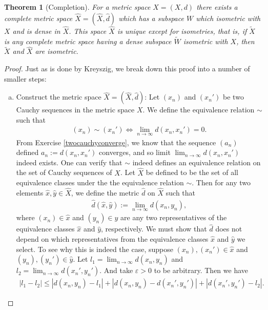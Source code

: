 \documentclass[11pt]{article}
\theoremstyle{mystyle}
\newtheorem{thm}{Theorem}[section]
\begin{document}
\begin{thm}[Completion]\label{completion}
For a metric space $X = (X, d)$ there exists a complete metric space $\hat{X} = (\hat{X}, \hat{d})$ which has a subspace $W$ which isometric with $X$ and is dense in $\hat{X}$. This space $\hat{X}$ is unique except for isometries, that is, if $\tilde{X}$ is any complete metric space having a dense subspace $\tilde{W}$ isometric with $X$, then $\tilde{X}$ and $\hat{X}$ are isometric.
\end{thm}
\begin{proof}
Just as is done by Kreyszig, we break down this proof into a number of smaller steps:
\begin{enumerate}[(a)] 
\item Construct the metric space $\hat{X} = (\hat{X}, \hat{d})$:\newline
Let $(x_n)$ and $(x_n')$ be two Cauchy sequences in the metric space $X$. We define the equivalence relation $\sim$ such that 
\begin{align*}
 (x_n) \sim (x_n') \iff \lim_{n \longrightarrow \infty} d(x_n, x_n') = 0.   
\end{align*}
From Exercise \ref{twocauchyconverge}, we know that the sequence $(a_n)$ defined $a_n := d(x_n, x_n')$ converges, and so limit $\lim_{n \longrightarrow \infty} d(x_n, x_n')$ indeed exists. One can verify that $\sim$ indeed defines an equivalence relation on the set of Cauchy sequences of $X$.\newline
Let $\hat{X}$ be defined to be the set of all equivalence classes under the the equivalence relation $\sim$. Then for any two elements $\hat{x}, \hat{y} \in \hat{X}$, we define the metric $\hat{d}$ on $\hat{X}$ such that
\begin{align*}
    \hat{d}(\hat{x}, \hat{y}) := \lim_{n \to \infty} d(x_n, y_n),
\end{align*}
where $(x_n) \in \hat{x}$ and $(y_n) \in \hat{y}$ are any two representatives of the equivalence classes $\hat{x}$ and $\hat{y}$, respectively. We must show that $\hat{d}$ does not depend on which representatives from the equivalence classes $\hat{x}$ and $\hat{y}$ we select.\newline 
To see why this is indeed the case, suppose $(x_n), (x_n') \in \hat{x}$ and $(y_n), (y_n') \in \hat{y}$. Let $l_1 = \lim_{n \to \infty} d(x_n, y_n)$ and $l_2 = \lim_{n \to \infty} d(x_n', y_n')$. And take $\varepsilon > 0$ to be arbitrary. Then we have
\begin{align*}
    |l_1 - l_2| \leq |d(x_n, y_n) - l_1|  + |d(x_n, y_n)  - d(x_n', y_n')| + |d(x_n', y_n') - l_2|.

\end{align*}
\end{enumerate}
\end{proof}
\end{document}
